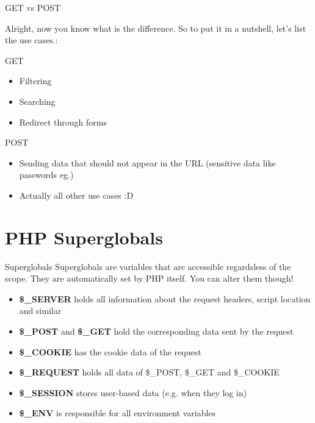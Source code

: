 \begin{frame}{GET vs POST}
	
	Alright, now you know what is the difference. So to put it in a nutshell, let's list the use cases.: \pause
	
	GET \pause
	\begin{itemize}
	\item Filtering \pause
	\item Searching \pause
	\item Redirect through forms \pause
	\end{itemize}	
	
	POST \pause
	\begin{itemize}
	\item Sending data that should not appear in the URL (sensitive data like passwords eg.) \pause
	\item Actually all other use cases :D
	\end{itemize}
	
	
\end{frame}

\section{PHP Superglobals}

\begin{frame}[fragile]{Superglobals}
Superglobals are variables that are accessible regardsless of the scope. They are automatically set by PHP itself. You can alter them though!
	\pause
	
	\begin{itemize}
        \item \textbf{\$\_{}SERVER} holds all information about the request headers, script location and similar	
        \pause
		\item \textbf{\$\_{}POST} and \textbf{\$\_{}GET} hold the corresponding data sent by the request
		\pause
		\item \textbf{\$\_{}COOKIE} has the cookie data of the request
		\pause
		\item \textbf{\$\_{}REQUEST} holds all data of \$\_{}POST, \$\_{}GET and \$\_{}COOKIE
		\pause
		\item \textbf{\$\_{}SESSION} stores user-based data (e.g. when they log in)
		\pause
		\item \textbf{\$\_{}ENV} is responsible for all environment variables
	\end{itemize}
\end{frame}

